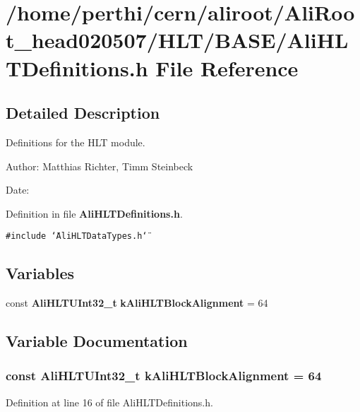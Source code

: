 \section{/home/perthi/cern/aliroot/Ali\-Root\_\-head020507/HLT/BASE/Ali\-HLTDefinitions.h File Reference}
\label{AliHLTDefinitions_8h}


\subsection{Detailed Description}
Definitions for the HLT module. 

\begin{Desc}
\item[Author:]Matthias Richter, Timm Steinbeck \end{Desc}
\begin{Desc}
\item[Date:]\end{Desc}


Definition in file {\bf Ali\-HLTDefinitions.h}.

{\tt \#include \char`\"{}Ali\-HLTData\-Types.h\char`\"{}}\par
\subsection*{Variables}
\begin{CompactItemize}
\item 
const {\bf Ali\-HLTUInt32\_\-t} {\bf k\-Ali\-HLTBlock\-Alignment} = 64
\end{CompactItemize}


\subsection{Variable Documentation}
\subsubsection{\setlength{\rightskip}{0pt plus 5cm}const {\bf Ali\-HLTUInt32\_\-t} {\bf k\-Ali\-HLTBlock\-Alignment} = 64}\label{AliHLTDefinitions_8h_a0}




Definition at line 16 of file Ali\-HLTDefinitions.h.